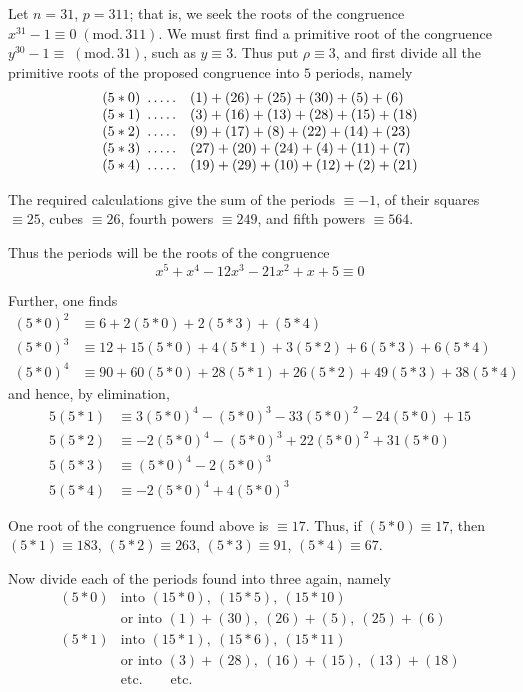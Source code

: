 Let $n=31$, $p=311$; that is, we seek the roots of the congruence $x^{31}-1\equiv0\;(\mathrm{mod.}\,311)$. We must first find a primitive root of the congruence $y^{30}-1\equiv\;(\mathrm{mod.}\,31)$, such as $y\equiv3$. Thus put $\rho\equiv3$, and first divide all the primitive roots of the proposed congruence into $5$ periods, namely
\[
\begin{array}{rl}
(5\ast0)\ \mathinner{.\,.\,.\,.\,.}&(1)+(26)+(25)+(30)+(5)+(6)\\
(5\ast1)\ \mathinner{.\,.\,.\,.\,.}&(3)+(16)+(13)+(28)+(15)+(18)\\
(5\ast2)\ \mathinner{.\,.\,.\,.\,.}&(9)+(17)+(8)+(22)+(14)+(23)\\
(5\ast3)\ \mathinner{.\,.\,.\,.\,.}&(27)+(20)+(24)+(4)+(11)+(7)\\
(5\ast4)\ \mathinner{.\,.\,.\,.\,.}&(19)+(29)+(10)+(12)+(2)+(21)
\end{array}
\]

The required calculations give the sum of the periods $\equiv-1$, of their squares $\equiv25$, cubes $\equiv26$, fourth powers $\equiv249$, and fifth powers $\equiv564$.

Thus the periods will be the roots of the congruence
\[
x^5+x^4-12x^3-21x^2+x+5\equiv0
\]

Further, one finds
\[
\begin{aligned}
(5\ast0)^2&\equiv6+2(5\ast0)+2(5\ast3)+(5\ast4)\\
(5\ast0)^3&\equiv12+15(5\ast0)+4(5\ast1)+3(5\ast2)+6(5\ast3)+6(5\ast4)\\
(5\ast0)^4&\equiv90+60(5\ast0)+28(5\ast1)+26(5\ast2)+49(5\ast3)+38(5\ast4)
\end{aligned}
\]
and hence, by elimination,
\[
\begin{aligned}
5(5\ast1)&\equiv3(5\ast0)^4-(5\ast0)^3-33(5\ast0)^2-24(5\ast0)+15\\
5(5\ast2)&\equiv-2(5\ast0)^4-(5\ast0)^3+22(5\ast0)^2+31(5\ast0)\\
5(5\ast3)&\equiv(5\ast0)^4-2(5\ast0)^3\\
5(5\ast4)&\equiv-2(5\ast0)^4+4(5\ast0)^3
\end{aligned}
\]

One root of the congruence found above is $\equiv17$. Thus, if $(5\ast0)\equiv17$, then $(5\ast1)\equiv183$, $(5\ast2)\equiv263$, $(5\ast3)\equiv91$, $(5\ast4)\equiv67$.

Now divide each of the periods found into three again, namely
\[
\begin{array}{rl}
(5\ast0)&\text{into }(15\ast0),\ (15\ast5),\ (15\ast10)\\
&\text{or into }(1)+(30),\ (26)+(5),\ (25)+(6)\\
(5\ast1)&\text{into }(15\ast1),\ (15\ast6),\ (15\ast11)\\
&\text{or into }(3)+(28),\ (16)+(15),\ (13)+(18)\\
&\text{etc.}\qquad\text{etc.}
\end{array}
\]

